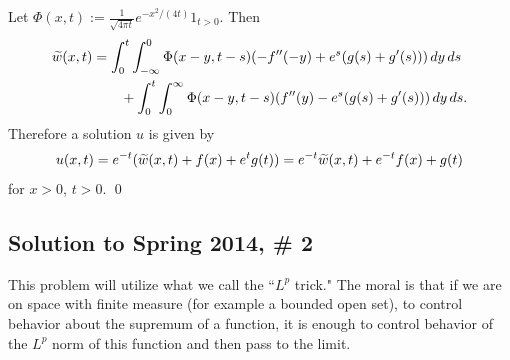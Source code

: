 Let $\Phi(x, t) := \frac{1}{\sqrt{4\pi t}}e^{-x^{2}/(4t)}1_{t > 0}.$ Then
\begin{align*}
\widetilde{w}(x, t) &= \int_{0}^{t}\int_{-\infty}^{0}\Phi(x - y, t - s)(-f''(-y) + e^{s}(g(s) + g'(s)))\, dy\, ds\\
&\quad\quad + \int_{0}^{t}\int_{0}^{\infty}\Phi(x - y, t - s)(f''(y) - e^{s}(g(s) + g'(s)))\, dy\, ds.
\end{align*}
Therefore a solution $u$ is given by
$$u(x, t) = e^{-t}(\widetilde{w}(x, t) + f(x) + e^{t}g(t)) = e^{-t}\widetilde{w}(x, t) + e^{-t}f(x) + g(t)$$
for $x > 0$, $t > 0$.
\hfill\qed

\subsection*{Solution to Spring 2014, \# 2}\label{s142}
This problem will utilize what we call the ``$L^{p}$ trick." The moral is that if we are on space with finite measure (for example a bounded open set),
to control behavior about the supremum of a function, it is enough to control behavior of the $L^{p}$ norm of this function and then pass to the limit.
